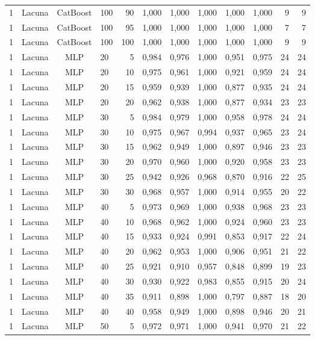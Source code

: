 \begin{longtable}{ccclrrrrrrrr}
1 & Lacuna & CatBoost & 100 & 90 & 1,000 & 1,000 & 1,000 & 1,000 & 1,000 & 9 & 9 \\
1 & Lacuna & CatBoost & 100 & 95 & 1,000 & 1,000 & 1,000 & 1,000 & 1,000 & 7 & 7 \\
1 & Lacuna & CatBoost & 100 & 100 & 1,000 & 1,000 & 1,000 & 1,000 & 1,000 & 9 & 9 \\
1 & Lacuna & MLP & 20 & 5 & 0,984 & 0,976 & 1,000 & 0,951 & 0,975 & 24 & 24 \\
1 & Lacuna & MLP & 20 & 10 & 0,975 & 0,961 & 1,000 & 0,921 & 0,959 & 24 & 24 \\
1 & Lacuna & MLP & 20 & 15 & 0,959 & 0,939 & 1,000 & 0,877 & 0,935 & 24 & 24 \\
1 & Lacuna & MLP & 20 & 20 & 0,962 & 0,938 & 1,000 & 0,877 & 0,934 & 23 & 23 \\
1 & Lacuna & MLP & 30 & 5 & 0,984 & 0,979 & 1,000 & 0,958 & 0,978 & 24 & 24 \\
1 & Lacuna & MLP & 30 & 10 & 0,975 & 0,967 & 0,994 & 0,937 & 0,965 & 23 & 24 \\
1 & Lacuna & MLP & 30 & 15 & 0,962 & 0,949 & 1,000 & 0,897 & 0,946 & 23 & 23 \\
1 & Lacuna & MLP & 30 & 20 & 0,970 & 0,960 & 1,000 & 0,920 & 0,958 & 23 & 23 \\
1 & Lacuna & MLP & 30 & 25 & 0,942 & 0,926 & 0,968 & 0,870 & 0,916 & 22 & 25 \\
1 & Lacuna & MLP & 30 & 30 & 0,968 & 0,957 & 1,000 & 0,914 & 0,955 & 20 & 22 \\
1 & Lacuna & MLP & 40 & 5 & 0,973 & 0,969 & 1,000 & 0,938 & 0,968 & 23 & 23 \\
1 & Lacuna & MLP & 40 & 10 & 0,968 & 0,962 & 1,000 & 0,924 & 0,960 & 23 & 23 \\
1 & Lacuna & MLP & 40 & 15 & 0,933 & 0,924 & 0,991 & 0,853 & 0,917 & 22 & 24 \\
1 & Lacuna & MLP & 40 & 20 & 0,962 & 0,953 & 1,000 & 0,906 & 0,951 & 21 & 22 \\
1 & Lacuna & MLP & 40 & 25 & 0,921 & 0,910 & 0,957 & 0,848 & 0,899 & 19 & 23 \\
1 & Lacuna & MLP & 40 & 30 & 0,930 & 0,922 & 0,983 & 0,855 & 0,915 & 20 & 24 \\
1 & Lacuna & MLP & 40 & 35 & 0,911 & 0,898 & 1,000 & 0,797 & 0,887 & 18 & 20 \\
1 & Lacuna & MLP & 40 & 40 & 0,958 & 0,949 & 1,000 & 0,898 & 0,946 & 20 & 21 \\
1 & Lacuna & MLP & 50 & 5 & 0,972 & 0,971 & 1,000 & 0,941 & 0,970 & 21 & 22 \\

\end{longtable}
